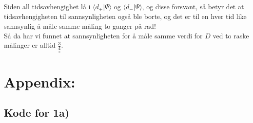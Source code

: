\documentclass[a4paper,norsk, 10pt]{article}
\numberwithin{equation}{section}
\begin{document}
Siden all tidsavhengighet lå i $\langle d_+|\Psi\rangle$ og $\langle d_-|\Psi\rangle$, og disse forsvant, så betyr det at tidsavhengigheten til sannsynligheten også ble borte, og det er til en hver tid like sannsynlig å måle samme måling to ganger på rad!\\


Så da har vi funnet at sannsynligheten for å måle samme verdi for $D$ ved to raske målinger er alltid $\underline{\underline{\frac{3}{4}}}$.



\section{Appendix:}
\subsection*{Kode for 1a)}

\label{lst:solver}
\end{document}
